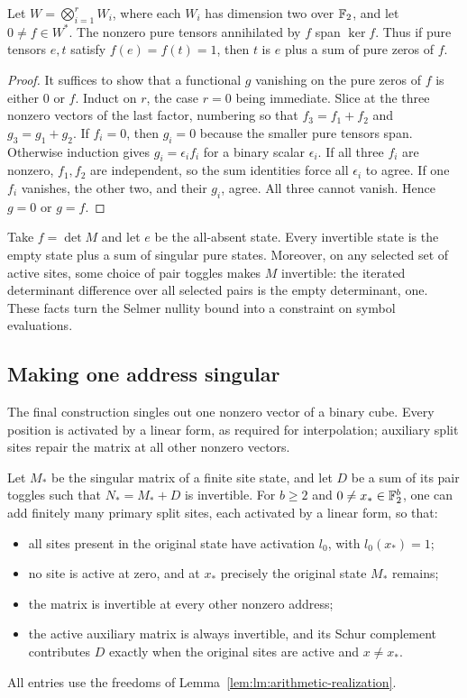 \begin{lemma}\label{lem:binary-tensor-span}
Let $W=\bigotimes_{i=1}^rW_i$, where each $W_i$ has dimension two
over $\mathbb F_2$, and let $0\ne f\in W^*$. The nonzero pure tensors
annihilated by $f$ span $\ker f$. Thus if pure tensors $e,t$ satisfy
$f(e)=f(t)=1$, then $t$ is $e$ plus a sum of pure zeros of $f$.
\end{lemma}

\begin{proof}
It suffices to show that a functional $g$ vanishing on the pure zeros
of $f$ is either $0$ or $f$. Induct on $r$, the case $r=0$ being
immediate. Slice at the three nonzero vectors of the last factor,
numbering so that $f_3=f_1+f_2$ and $g_3=g_1+g_2$.
If $f_i=0$, then $g_i=0$ because the smaller pure tensors span.
Otherwise induction gives $g_i=\epsilon_i f_i$ for a binary scalar
$\epsilon_i$. If all three $f_i$ are nonzero, $f_1,f_2$ are independent,
so the sum identities force all $\epsilon_i$ to agree. If one $f_i$
vanishes, the other two, and their $g_i$, agree. All three cannot vanish.
Hence $g=0$ or $g=f$.
\end{proof}

Take $f=\det M$ and let $e$ be the all-absent state. Every invertible
state is the empty state plus a sum of singular pure states.
Moreover, on any selected set of active sites, some choice of pair
toggles makes $M$ invertible: the iterated determinant difference over
all selected pairs is the empty determinant, one. These facts turn the
Selmer nullity bound into a constraint on symbol evaluations.

\subsection{Making one address singular}

The final construction singles out one nonzero vector of a binary
cube. Every position is activated by a linear form, as required for
interpolation; auxiliary split sites repair the matrix at all other
nonzero vectors.

\begin{lemma}\label{lem:lm:address-program}
Let $M_*$ be the singular matrix of a finite site state, and let $D$
be a sum of its pair toggles such that $N_*=M_*+D$ is invertible.
For $b\geq2$ and $0\ne x_*\in\mathbb F_2^b$, one can add finitely many
primary split sites, each activated by a linear form, so that:
\begin{itemize}
\item all sites present in the original state have activation $l_0$,
with $l_0(x_*)=1$;
\item no site is active at zero, and at $x_*$ precisely the original
state $M_*$ remains;
\item the matrix is invertible at every other nonzero address;
\item the active auxiliary matrix is always invertible, and its Schur
complement contributes $D$ exactly when the original sites are active
and $x\ne x_*$.
\end{itemize}
All entries use the freedoms of
Lemma~\ref{lem:lm:arithmetic-realization}.
\end{lemma}

